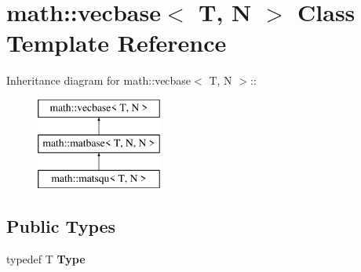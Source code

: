 \hypertarget{classmath_1_1vecbase}{
\section{math::vecbase$<$ T, N $>$ Class Template Reference}
\label{classmath_1_1vecbase}
}
Inheritance diagram for math::vecbase$<$ T, N $>$::\begin{figure}[H]
\begin{center}
\leavevmode
\includegraphics[height=3cm]{classmath_1_1vecbase}
\end{center}
\end{figure}
\subsection*{Public Types}
\begin{DoxyCompactItemize}
\item 
\hypertarget{classmath_1_1vecbase_a26c60dd255fe154d21df8d22d4e97e10}{
typedef T {\bfseries Type}}
\label{classmath_1_1vecbase_a26c60dd255fe154d21df8d22d4e97e10}

\end{DoxyCompactItemize}
